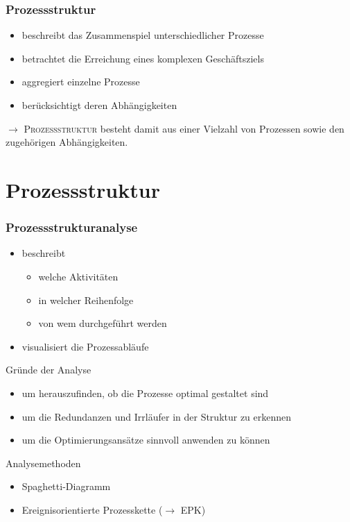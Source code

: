 \documentclass[xcolor=dvipsnames]{beamer}
\begin{document}
\begin{frame}
  \frametitle{Prozessstruktur}


\begin{itemize}
  \item beschreibt das Zusammenspiel unterschiedlicher Prozesse
  \item betrachtet die Erreichung eines komplexen Geschäftsziels
  \item aggregiert einzelne Prozesse
  \item berücksichtigt deren Abhängigkeiten
\end{itemize}
\bigskip

$\rightarrow$ \textsc{Prozessstruktur} besteht damit aus einer Vielzahl von Prozessen sowie den zugehörigen Abhängigkeiten.

\end{frame}
 \section[Prozessstruktur]{Prozessstruktur}
 \begin{frame}
  \frametitle{Prozessstrukturanalyse}
  \begin{itemize}
  \item beschreibt
  \begin{itemize}
    \item welche Aktivitäten
    \item in welcher Reihenfolge
    \item von wem durchgeführt werden
  \end{itemize}
  \item visualisiert die Prozessabläufe
  \end{itemize}  \pause


Gründe der Analyse
   \begin{itemize}
      \item um herauszufinden, ob die Prozesse optimal gestaltet sind
      \item um die Redundanzen und Irrläufer in der Struktur zu erkennen
      \item um die Optimierungsansätze sinnvoll anwenden zu können
    \end{itemize}  \pause


Analysemethoden
  \begin{itemize}
   \item Spaghetti-Diagramm
   \item Ereignisorientierte Prozesskette ($\rightarrow$ EPK)
  \end{itemize}

 \end{frame}
\end{document}

